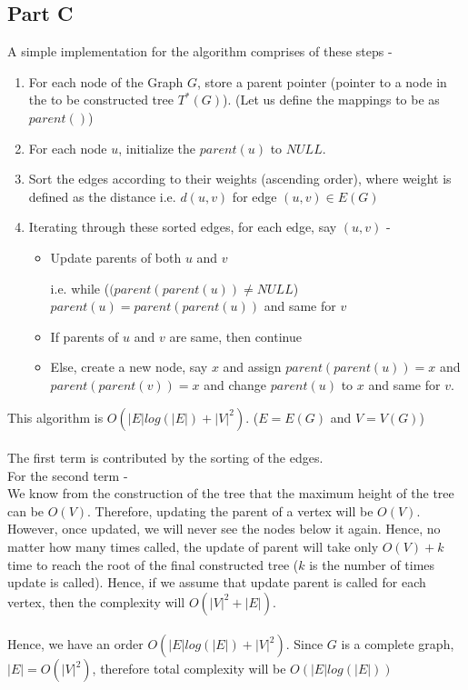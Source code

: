 \documentclass{article}
\begin{document}
    \subsection*{Part C}
    
        A simple implementation for the algorithm comprises of these steps -
        
        \begin{enumerate}
            \item For each node of the Graph $G$, store a parent pointer (pointer to a node in the to be constructed tree $T^{*}(G)$). (Let us define the mappings to be as $parent()$)
            \item For each node $u$, initialize the $parent(u)$ to $NULL$.
            \item Sort the edges according to their weights (ascending order), where weight is defined as the distance i.e. $d(u, v)$ for edge $(u, v) \in E(G)$
            \item Iterating through these sorted edges, for each edge, say $(u, v)$ -
            \begin{itemize}
                \item Update parents of both $u$ and $v$
                
                i.e. while ($(parent(parent(u)) \ne NULL$) { $parent(u) = parent(parent(u))$ } and same for $v$
                \item If parents of $u$ and $v$ are same, then continue
                \item Else, create a new node, say $x$ and assign $parent(parent(u)) = x$ and $parent(parent(v)) = x$ and change $parent(u)$ to $x$ and same for $v$.
            \end{itemize}
        \end{enumerate}
        This algorithm is $O(|E|log(|E|) + |V|^2)$. ($E = E(G)$ and $V = V(G)$)
        \\
        \\
        The first term is contributed by the sorting of the edges.
        \\
        For the second term -
        \\
        We know from the construction of the tree that the maximum height of the tree can be $O(V)$. Therefore, updating the parent of a vertex will be $O(V)$. However, once updated, we will never see the nodes below it again. Hence, no matter how many times called, the update of parent will take only $O(V) + k$ time to reach the root of the final constructed tree ($k$ is the number of times update is called). Hence, if we assume that update parent is called for each vertex, then the complexity will $O(|V|^2 + |E|)$.
        \\
        \\
        Hence, we have an order $O(|E|log(|E|) + |V|^2)$. Since $G$ is a complete graph, $|E| = O(|V|^2)$, therefore total complexity will be $O(|E|log(|E|))$
        
\end{document}
